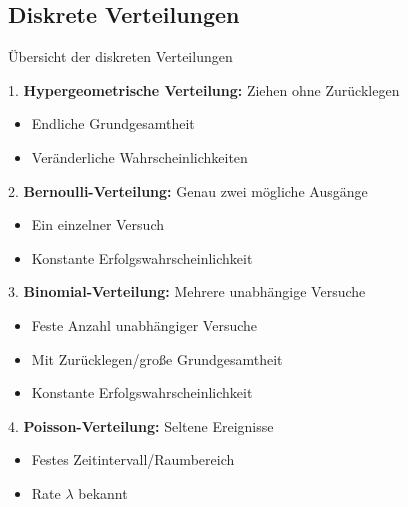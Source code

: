 
\subsection{Diskrete Verteilungen}

\begin{theorem}{Übersicht der diskreten Verteilungen}
    
1. \textbf{Hypergeometrische Verteilung:} Ziehen ohne Zurücklegen
   \begin{itemize}
   \item Endliche Grundgesamtheit
   \item Veränderliche Wahrscheinlichkeiten
   \end{itemize}
2. \textbf{Bernoulli-Verteilung:} Genau zwei mögliche Ausgänge
   \begin{itemize}
   \item Ein einzelner Versuch
   \item Konstante Erfolgswahrscheinlichkeit
   \end{itemize}
3. \textbf{Binomial-Verteilung:} Mehrere unabhängige Versuche
   \begin{itemize}
   \item Feste Anzahl unabhängiger Versuche
   \item Mit Zurücklegen/große Grundgesamtheit
   \item Konstante Erfolgswahrscheinlichkeit
   \end{itemize}
4. \textbf{Poisson-Verteilung:} Seltene Ereignisse
   \begin{itemize}
   \item Festes Zeitintervall/Raumbereich 
   \item Rate $\lambda$ bekannt
   \end{itemize}
\end{theorem}

